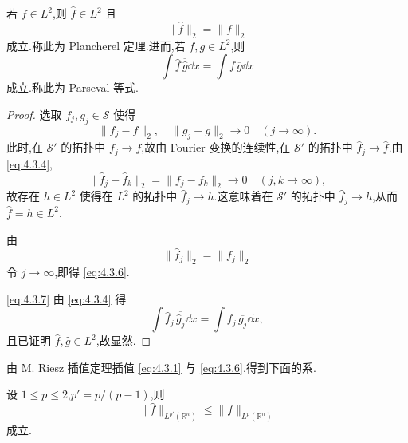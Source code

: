 \begin{theorem}\label{thm:4.3.9}
若 $f \in L^{2}$,则 $\hat{f} \in L^{2}$ 且
\begin{equation}
\|\hat{f}\|_{2} = \|f\|_{2}\tag{4.3.6}
\label{eq:4.3.6}\end{equation}
成立.称此为 Plancherel 定理.进而,若 $f, g \in L^{2}$,则
\begin{equation}
\int\widehat{f}\,\overline{\widehat{g}}\dd x = \int f\,\overline{g}\dd x\tag{4.3.7}
\label{eq:4.3.7}\end{equation}
成立.称此为 Parseval 等式.
\end{theorem}

\begin{proof}
选取 $f_{j}, g_{j} \in \mathcal{S}$ 使得
\begin{equation*}
\|f_{j} - f\|_{2}, \quad \|g_{j} - g\|_{2} \to 0 \quad (j \to \infty).
\end{equation*}
此时,在 $\mathcal{S}'$ 的拓扑中 $f_{j} \to f$,故由 Fourier 变换的连续性,在 $\mathcal{S}'$ 的拓扑中 $\hat{f}_{j} \to \hat{f}$.由 \eqref{eq:4.3.4},
\begin{equation*}
\|\hat{f}_{j} - \hat{f}_{k}\|_{2} = \|f_{j} - f_{k}\|_{2} \to 0 \quad (j, k \to \infty),
\end{equation*}
故存在 $h \in L^{2}$ 使得在 $L^{2}$ 的拓扑中 $\hat{f}_{j} \to h$.这意味着在 $\mathcal{S}'$ 的拓扑中 $\hat{f}_{j} \to h$,从而 $\hat{f} = h \in L^{2}$.

由
\begin{equation*}
\|\hat{f}_{j}\|_{2} = \|f_{j}\|_{2}
\end{equation*}
令 $j \to \infty$,即得 \eqref{eq:4.3.6}.

\eqref{eq:4.3.7} 由 \eqref{eq:4.3.4} 得
\begin{equation*}
\int\hat{f}_{j}\,\overline{\widehat{g}_{j}}\dd x = \int f_{j}\,\overline{g_{j}}\dd x,
\end{equation*}
且已证明 $\hat{f}, \hat{g} \in L^{2}$,故显然.
\end{proof}

由 M. Riesz 插值定理插值 \eqref{eq:4.3.1} 与 \eqref{eq:4.3.6},得到下面的系.

\begin{corollary}\label{cor:4.3.10}
设 $1 \leq p \leq 2$,$p' = p/(p-1)$,则
\begin{equation}
\|\hat{f}\|_{L^{p'}(\mathbb{R}^{n})} \leq \|f\|_{L^{p}(\mathbb{R}^{n})}\tag{4.3.8}
\label{eq:4.3.8}\end{equation}
成立.
\end{corollary}
